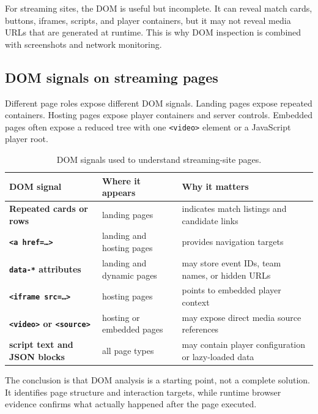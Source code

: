 

For streaming sites, the DOM is useful but incomplete. It can reveal match cards,
buttons, iframes, scripts, and player containers, but it may not reveal media URLs that
are generated at runtime. This is why DOM inspection is combined with screenshots and
network monitoring.

\subsection{DOM signals on streaming pages}

Different page roles expose different DOM signals. Landing pages expose repeated
containers. Hosting pages expose player containers and server controls. Embedded pages
often expose a reduced tree with one \texttt{<video>} element or a JavaScript player
root.

\begin{table}[!htbp]
\centering
\begin{tabularx}{\textwidth}{>{\raggedright\arraybackslash\bfseries}p{3.4cm}
                              >{\raggedright\arraybackslash}X
                              >{\raggedright\arraybackslash}X}
\toprule
\rowcolor{accent!8}
DOM signal & Where it appears & Why it matters \\ \midrule
Repeated cards or rows & landing pages & indicates match listings and candidate links \\
\texttt{<a href=\ldots>} & landing and hosting pages & provides navigation targets \\
\texttt{data-*} attributes & landing and dynamic pages & may store event IDs, team
names, or hidden URLs \\
\texttt{<iframe src=\ldots>} & hosting pages & points to embedded player context \\
\texttt{<video>} or \texttt{<source>} & hosting or embedded pages & may expose direct
media source references \\
script text and JSON blocks & all page types & may contain player configuration or
lazy-loaded data \\
\bottomrule
\end{tabularx}
\caption{DOM signals used to understand streaming-site pages.}\label{tab:dom-signals}
\end{table}

The conclusion is that DOM analysis is a starting point, not a complete solution. It
identifies page structure and interaction targets, while runtime browser evidence
confirms what actually happened after the page executed.

